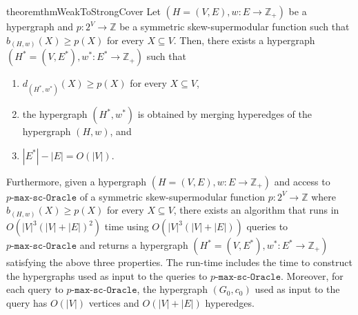 \documentclass{article}
\newcommand{\functionMaximizationOracleStrongCover}[1]{\ensuremath{{#1}\text{-}\mathtt{max}\text{-}\mathtt{sc}\text{-}\mathtt{Oracle}}\xspace}
\providecommand{\Z}{\mathbb{Z}}
\begin{document}
\begin{restatable}{theorem}{thmWeakToStrongCover}\label{thm:WeakToStrongCover:main}
Let $(H=(V, E), w: E\rightarrow \Z_+)$ be a hypergraph and $p:2^V\rightarrow \Z$ be a symmetric skew-supermodular function such that 
$b_{(H, w)}(X) \geq p(X)$ for every $X \subseteq V$. 
Then, there exists a hypergraph \linebreak $\left(H^* = (V, E^*), w^*:E^* \rightarrow\Z_+\right)$ 
such that
\begin{enumerate}[label=$(\arabic*)$, ref=(\arabic*)]
    \item \label{thm:WeakToStrongCover:main:(1)} $d_{(H^*, w^*)}(X) \geq p(X)$ for every $X\subseteq V$,
    \item \label{thm:WeakToStrongCover:main:(2)} the hypergraph $(H^*,w^*)$ is obtained by merging hyperedges of the hypergraph $(H, w)$, and
    \item \label{thm:WeakToStrongCover:main:(3)} $|E^*| - |E| = O(|V|)$.
\end{enumerate}
Furthermore, given a hypergraph $(H=(V, E), w: E\rightarrow \Z_+)$ and access to \functionMaximizationOracleStrongCover{p} of a symmetric skew-supermodular function $p: 2^V\rightarrow \Z$ where $b_{(H, w)}(X)\ge p(X)$ for every $X\subseteq V$, there exists an algorithm that runs in $O(|V|^3(|V| + |E|)^2)$ time using $O(|V|^3(|V|+|E|))$ queries to \functionMaximizationOracleStrongCover{p} and returns a hypergraph $\left(H^* = (V, E^*), w^*:E^* \rightarrow\Z_+\right)$ satisfying the above three properties. The run-time includes the time to construct the hypergraphs used as input to the queries to \functionMaximizationOracleStrongCover{p}.
Moreover, for each query to \functionMaximizationOracleStrongCover{p}, the hypergraph $(G_0, c_0)$ used as input to the query has $O(|V|)$ vertices and $O(|V|+|E|)$ hyperedges.
\end{restatable}
\end{document}
